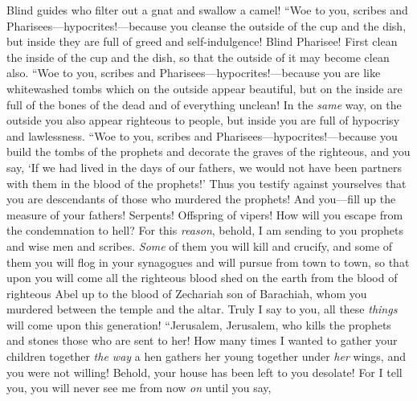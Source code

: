 \begin{biblechapter}
\verse Blind guides who filter out a gnat and swallow a camel!
\verse “Woe to you, scribes and Pharisees—hypocrites!—because you cleanse the outside of the cup and the dish, but inside they are full of greed and self-indulgence!
\verse Blind Pharisee! First clean the inside of the cup and the dish, so that the outside of it may become clean also.
\verse “Woe to you, scribes and Pharisees—hypocrites!—because you are like whitewashed tombs which on the outside appear beautiful, but on the inside are full of the bones of the dead and of everything unclean!
\verse In the \textit{same} way, on the outside you also appear righteous to people, but inside you are full of hypocrisy and lawlessness.
\verse “Woe to you, scribes and Pharisees—hypocrites!—because you build the tombs of the prophets and decorate the graves of the righteous,
\verse and you say, ‘If we had lived in the days of our fathers, we would not have been partners with them in the blood of the prophets!’
\verse Thus you testify against yourselves that you are descendants of those who murdered the prophets!
\verse And you—fill up the measure of your fathers!
\verse Serpents! Offspring of vipers! How will you escape from the condemnation to hell?
\verse For this \textit{reason}, behold, I am sending to you prophets and wise men and scribes. \textit{Some} of them you will kill and crucify, and some of them you will flog in your synagogues and will pursue from town to town,
\verse so that upon you will come all the righteous blood shed on the earth from the blood of righteous Abel up to the blood of Zechariah son of Barachiah, whom you murdered between the temple and the altar.
\verse Truly I say to you, all these \textit{things} will come upon this generation!
 “Jerusalem, Jerusalem, who kills the prophets and stones those who are sent to her! How many times I wanted to gather your children together \textit{the way} a hen gathers her young together under \textit{her} wings, and you were not willing!
\verse Behold, your house has been left to you desolate!
\verse For I tell you, you will never see me from now \textit{on} until you say,
\end{biblechapter}

